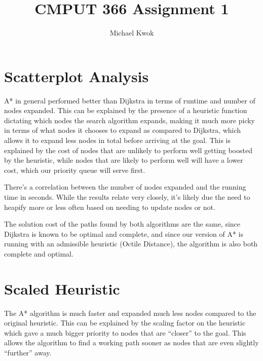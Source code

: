 \documentclass{article}
\title{CMPUT 366 Assignment 1}
\author{Michael Kwok}
\begin{document}
\maketitle
\section*{Scatterplot Analysis}

\begin{figure}

\end{figure}

A* in general performed better than Dijkstra in terms of runtime and number of nodes expanded. This can be explained by the presence of a heuristic function dictating which nodes the search algorithm expands, making it much more picky in terms of what nodes it chooses to expand as compared to Dijkstra, which allows it to expand less nodes in total before arriving at the goal. This is explained by the cost of nodes that are unlikely to perform well getting boosted by the heuristic, while nodes that are likely to perform well will have a lower cost, which our priority queue will serve first.

There's a correlation between the number of nodes expanded and the running time in seconds. While the results relate very closely, it's likely due the need to heapify more or less often based on needing to update nodes or not.

The solution cost of the paths found by both algorithms are the same, since Dijkstra is known to be optimal and complete, and since our version of A* is running with an admissible heuristic (Octile Distance), the algorithm is also both complete and optimal.


\section*{Scaled Heuristic}

The A* algorithm is much faster and expanded much less nodes compared to the original heuristic. This can be explained by the scaling factor on the heuristic which gave a much bigger priority to nodes that are ``closer'' to the goal. This allows the algorithm to find a working path sooner as nodes that are even slightly ``further'' away.
\end{document}
